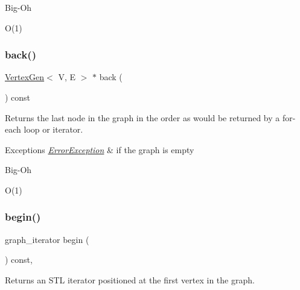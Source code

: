 \begin{DoxyRefDesc}{Big-\/\+Oh}
\item[\mbox{\hyperlink{BigOh__BigOh000047}{Big-\/\+Oh}}]O(1) \end{DoxyRefDesc}
\mbox{\label{classGraph_a27d59ef129bb56cc144ecc81c0affd34}} 
\subsubsection{\texorpdfstring{back()}{back()}}
{\footnotesize\ttfamily \mbox{\hyperlink{classVertexGen}{Vertex\+Gen}}$<$ V, E $>$  $\ast$ back (\begin{DoxyParamCaption}{ }\end{DoxyParamCaption}) const\hspace{0.3cm}{\ttfamily [inherited]}}



Returns the last node in the graph in the order as would be returned by a for-\/each loop or iterator. 


\begin{DoxyExceptions}{Exceptions}
{\em \mbox{\hyperlink{classErrorException}{Error\+Exception}}} & if the graph is empty \\
\hline
\end{DoxyExceptions}
\begin{DoxyRefDesc}{Big-\/\+Oh}
\item[\mbox{\hyperlink{BigOh__BigOh000048}{Big-\/\+Oh}}]O(1) \end{DoxyRefDesc}
\mbox{\label{classGraph_aea3a8950c46f4ac913207201b685e715}} 
\subsubsection{\texorpdfstring{begin()}{begin()}}
{\footnotesize\ttfamily graph\+\_\+iterator begin (\begin{DoxyParamCaption}{ }\end{DoxyParamCaption}) const\hspace{0.3cm}{\ttfamily [inline]}, {\ttfamily [inherited]}}



Returns an S\+TL iterator positioned at the first vertex in the graph. 

